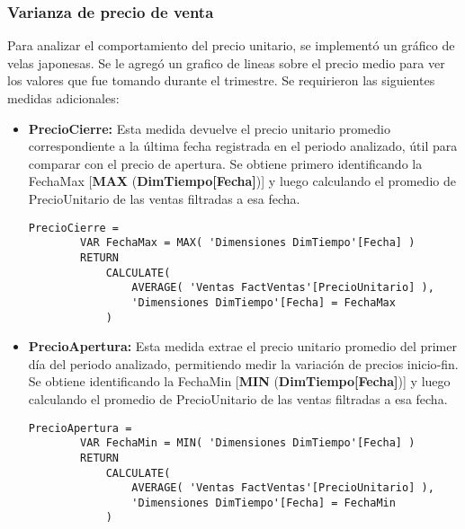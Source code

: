 \documentclass{article}
\begin{document}
\subsubsection{Varianza de precio de venta}
Para analizar el comportamiento del precio unitario, se implementó un gráfico de velas japonesas. Se le agregó un grafico de lineas sobre el precio medio para ver los valores que fue tomando durante el trimestre. Se requirieron las siguientes medidas adicionales:
\begin{itemize}
    \item \textbf{PrecioCierre: } Esta medida devuelve el precio unitario promedio correspondiente a la última fecha registrada en el periodo analizado, útil para comparar con el precio de apertura.
Se obtiene primero identificando la FechaMax [\textbf{MAX} (\textbf{DimTiempo[Fecha]})] y luego calculando el promedio de PrecioUnitario de las ventas filtradas a esa fecha.

    \begin{tcolorbox}[boxrule=0.3pt,sharp corners]
        \begin{lstlisting}[gobble=4]
    PrecioCierre = 
        VAR FechaMax = MAX( 'Dimensiones DimTiempo'[Fecha] )
        RETURN
            CALCULATE(
                AVERAGE( 'Ventas FactVentas'[PrecioUnitario] ),
                'Dimensiones DimTiempo'[Fecha] = FechaMax
            )
        \end{lstlisting}
    \end{tcolorbox}

\end{itemize}


\begin{itemize}
    \item \textbf{PrecioApertura: } Esta medida extrae el precio unitario promedio del primer día del periodo analizado, permitiendo medir la variación de precios inicio‑fin.
Se obtiene identificando la FechaMin [\textbf{MIN} (\textbf{DimTiempo[Fecha]})] y luego calculando el promedio de PrecioUnitario de las ventas filtradas a esa fecha.

    \begin{tcolorbox}[boxrule=0.3pt,sharp corners]
        \begin{lstlisting}[gobble=4]
    PrecioApertura = 
        VAR FechaMin = MIN( 'Dimensiones DimTiempo'[Fecha] )
        RETURN
            CALCULATE(
                AVERAGE( 'Ventas FactVentas'[PrecioUnitario] ),
                'Dimensiones DimTiempo'[Fecha] = FechaMin
            )
        \end{lstlisting}
    \end{tcolorbox}

\end{itemize}
\end{document}

